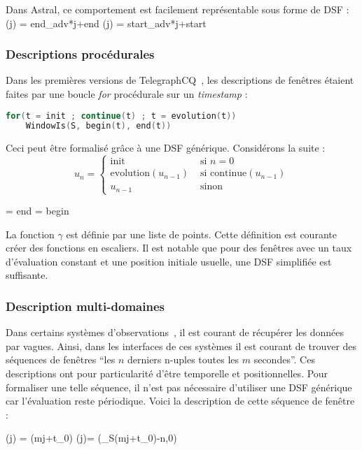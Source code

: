 Dans Astral, ce comportement est facilement représentable sous forme de DSF :
	{\beta(j) = \textrm{end\_adv}*j+\textrm{end}}
	{\alpha(j) = \textrm{start\_adv}*j+\textrm{start}}

\subsubsection{Descriptions procédurales}
Dans les premières versions de TelegraphCQ~\cite{Chandrasekaran:telegraphcq}, les descriptions de fenêtres étaient faites par une boucle \textit{for} procédurale sur un \textit{timestamp} :
\begin{lstlisting}[language=C]
for(t = init ; continue(t) ; t = evolution(t))
	WindowIs(S, begin(t), end(t))
\end{lstlisting}

Ceci peut être formalisé grâce à une DSF générique. Considérons la suite : $$u_n= \begin{cases} \mathrm{init} & \textrm{ si } n=0 \\ \mathrm{evolution}(u_{n-1}) & \textrm{ si } \mathrm{continue}(u_{n-1}) \\ u_{n-1} & \textrm{ sinon} \end{cases}$$

\DSF{\gamma(t,i) = \displaystyle\sum_{i=0}^{+\infty} u_i \indic_{[u_i, u_{i+1}[}(t)}
	{\beta = \textrm{end}}
	{\alpha = \textrm{begin}}

La fonction $\gamma$ est définie par une liste de points. Cette définition est courante créer des fonctions en escaliers. Il est notable que pour des fenêtres avec un taux d'évaluation constant et une position initiale usuelle, une DSF simplifiée est suffisante. 
\subsubsection{Description multi-domaines}
Dans certains systèmes d'observations~\cite{Jurdak:sumac}, il est courant de récupérer les données par vagues. Ainsi, dans les interfaces de ces systèmes il est courant de trouver des séquences de fenêtres \enquote{les $n$ derniers n-uples toutes les $m$ secondes}. Ces descriptions ont pour particularité d'être temporelle et positionnelles. Pour formaliser une telle séquence, il n'est pas nécessaire d'utiliser une DSF générique car l'évaluation reste périodique. Voici la description de cette séquence de fenêtre :

	{\beta(j) = \rtau(mj+t_0)}
	{\alpha(j)= \max(\rtau_S(mj+t_0)-n,0)}

